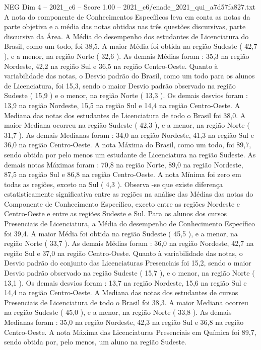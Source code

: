 \begin{textsample}{NEG Dim 4 – 2021\_c6 – Score 1.00 – 2021\_c6/enade\_2021\_qui\_a7d57fa827.txt}
A nota do componente de Conhecimentos Específicos leva em conta as notas da parte objetiva e a média das notas obtidas nas três questões discursivas, parte discursiva da Área.
A Média do desempenho dos estudantes de Licenciatura do Brasil, como um todo, foi 38,5.
A maior Média foi obtida na região Sudeste ( 42,7 ), e a menor, na região Norte ( 32,6 ).
As demais Médias foram : 35,3 na região Nordeste, 42,2 na região Sul e 36,5 na região Centro-Oeste.
Quanto à variabilidade das notas, o Desvio padrão do Brasil, como um todo para os alunos de Licenciatura, foi 15,3, sendo o maior Desvio padrão observado na região Sudeste ( 15,9 ) e o menor, na região Norte ( 13,3 ).
Os demais desvios foram : 13,9 na região Nordeste, 15,5 na região Sul e 14,4 na região Centro-Oeste.
A Mediana das notas dos estudantes de Licenciatura de todo o Brasil foi 38,0.
A maior Mediana ocorreu na região Sudeste ( 42,3 ), e a menor, na região Norte ( 31,7 ).
As demais Medianas foram : 34,0 na região Nordeste, 41,3 na região Sul e 36,0 na região Centro-Oeste.
A nota Máxima do Brasil, como um todo, foi 89,7, sendo obtida por pelo menos um estudante de Licenciatura na região Sudeste.
As demais notas Máximas foram : 70,8 na região Norte, 89,0 na região Nordeste, 87,5 na região Sul e 86,8 na região Centro-Oeste.
A nota Mínima foi zero em todas as regiões, exceto na Sul ( 4,3 ).
Observa -se que existe diferença estatisticamente significativa entre as regiões na análise das Médias das notas do Componente de Conhecimento Específico, exceto entre as regiões Nordeste e Centro-Oeste e entre as regiões Sudeste e Sul.
Para os alunos dos cursos Presenciais de Licenciatura, a Média do desempenho de Conhecimento Específico foi 39,4.
A maior Média foi obtida na região Sudeste ( 45,5 ), e a menor, na região Norte ( 33,7 ).
As demais Médias foram : 36,0 na região Nordeste, 42,7 na região Sul e 37,0 na região Centro-Oeste.
Quanto à variabilidade das notas, o Desvio padrão do conjunto das Licenciaturas Presenciais foi 15,2, sendo o maior Desvio padrão observado na região Sudeste ( 15,7 ), e o menor, na região Norte ( 13,1 ).
Os demais desvios foram : 13,7 na região Nordeste, 15,6 na região Sul e 14,4 na região Centro-Oeste.
A Mediana das notas dos estudantes de cursos Presenciais de Licenciatura de todo o Brasil foi 38,3.
A maior Mediana ocorreu na região Sudeste ( 45,0 ), e a menor, na região Norte ( 33,8 ).
As demais Medianas foram : 35,0 na região Nordeste, 42,3 na região Sul e 36,8 na região Centro-Oeste.
A nota Máxima das Licenciaturas Presenciais em Química foi 89,7, sendo obtida por, pelo menos, um aluno na região Sudeste.

\end{textsample}
